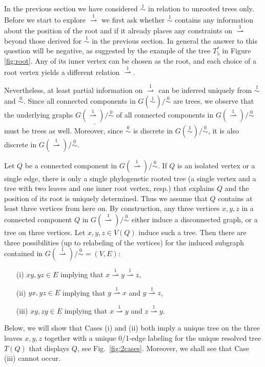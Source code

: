\documentclass[smallextended]{svjour3}
\newcommand{\rev}[1]{\begingroup\color{blue}#1\endgroup}
\newcommand{\Ro}{\mathrel{\overset{0}{\sim}}}
\newcommand{\Rl}{\mathrel{\overset{1}{\sim}}}
\newcommand{\Rld}{\mathrel{\overset{1}{\rightharpoonup}}}
\begin{document}
In the previous section we have considered $\Rl$ in relation to unrooted
trees only. Before we start to explore $\Rld$ we first ask whether $\Rl$
contains any information about the position of the root and if it already
places any constraints on $\Rld$ beyond those derived for $\Rl$ in the
previous section. In general the answer to this question will be negative,
as suggested by the example of the tree $T_5^*$ in Figure
\ref{fig:root}. Any of its inner vertex can be chosen as the root, and
each choice of a root vertex yields a different relation $\Rld$.

Nevertheless, at least partial information on $\Rld$ can be inferred
uniquely from $\Rl$ and $\Ro$. Since all connected components in
$G(\Rl)/\Ro$ are trees, we observe that the underlying graphs
$\underline{G(\Rld)/\Ro}$ of all connected components in $G(\Rld)/\Ro$ must
be trees as well.  Moreover, since $\Ro$ is discrete in $G(\Rl)/\Ro$, it is
also discrete in $G(\Rld)/\Ro$.

Let $Q$ be a connected component in ${G(\Rld)/\Ro}$.  \rev{If
$Q$ is an isolated vertex or a single edge, there is only a single phylogenetic 
rooted tree (a single vertex and a tree with two leaves and one inner root vertex, resp.)
that explains $Q$  and the position of its root is
uniquely determined.}
Thus we assume that $Q$ contains at least three
vertices from here on. By construction, any three vertices $x,y,z$ in a
connected component $Q$ in $G(\Rld)/\Ro$ either induce a disconnected
graph, or a tree on three vertices.  Let $x,y,z\in V(Q)$ induce such a
tree. Then there are three possibilities (up to relabeling of the vertices)
for the induced subgraph contained in $G(\Rld)/\Ro = (V,E)$:
\begin{itemize}
\item[(i)] $xy, yz \in E$ implying that $x\Rld y \Rld z$, 
\item[(ii)] $yx, yz \in E$ implying that $y\Rld x$ and $y \Rld z$,
\item[(iii)] $xy, zy \in E$ implying that $x\Rld y$ and $z \Rld y$. 
\end{itemize}
Below, we will show that Cases (i) and (ii) both imply a unique tree on the
three leaves $x,y,z$ together with a unique 0/1-edge labeling for the
unique resolved tree $T(Q)$ that displays $Q$, see Fig.\
\ref{fig:2cases}. Moreover, we shall see that Case (iii) cannot occur.
\end{document}
